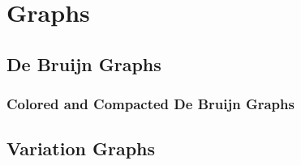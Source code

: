 \section{Graphs}

\subsection{De Bruijn Graphs}
\subsubsection{Colored and Compacted De Bruijn Graphs}
\subsection{Variation Graphs}

